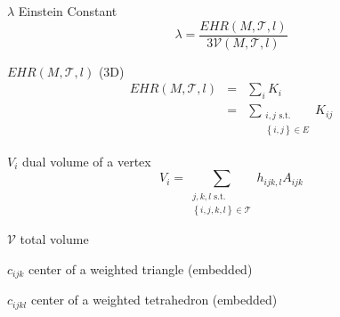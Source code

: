 $\lambda $ Einstein Constant%
\[
\lambda =\frac{EHR\left( M,\mathcal{T},l\right) }{3\mathcal{V}\left( M,%
\mathcal{T},l\right) } 
\]

$EHR\left( M,\mathcal{T},l\right) $ (3D)%
\begin{eqnarray*}
EHR\left( M,\mathcal{T},l\right) &=&\sum_{i}K_{i} \\
&=&\sum_{\substack{ i,j\text{ s.t.}  \\ \left\{ i,j\right\} \in E}}K_{ij}
\end{eqnarray*}

$V_{i}$ dual volume of a vertex%
\[
V_{i}=\sum_{\substack{ j,k,l\text{ s.t.}  \\ \left\{ i,j,k,l\right\} \in 
\mathcal{T}}}h_{ijk,l}A_{ijk} 
\]

$\mathcal{V}$ total volume

$c_{ijk}$ center of a weighted triangle (embedded)

$c_{ijkl}$ center of a weighted tetrahedron (embedded)
